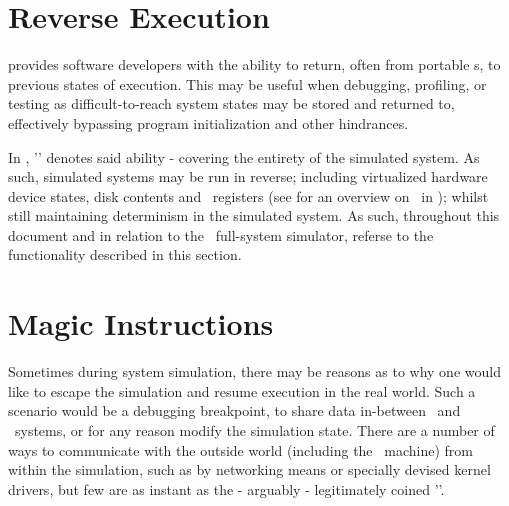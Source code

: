 \section{Reverse Execution}
\label{sec:background_reverseexecution}

 provides software developers with the ability to return, often from portable \dvttermcheckpoint s, to previous states of execution.
This may be useful when debugging, profiling, or testing as difficult-to-reach system states may be stored and returned to, effectively bypassing program initialization and other hindrances.

In \dvttermsimics , '\dvttermreverseexecution ' denotes said ability - covering the entirety of the simulated system.
As such, simulated systems may be run in reverse; including virtualized hardware device states, disk contents and \dvttermcpu\ registers (see  for an overview on \dvttermreverseexecution\ in \dvttermsimics ); whilst still maintaining determinism in the simulated system.
As such, throughout this document and in relation to the \dvttermsimics\ full-system simulator, \dvttermreverseexecution referse to the functionality described in this section.

\section{Magic Instructions}
\label{sec:background_magicinstructions}
Sometimes during system simulation, there may be reasons as to why one would like to escape the simulation and resume execution in the real world.
Such a scenario would be a debugging breakpoint, to share data in-between \dvttermtarget\ and \dvttermhost\ systems, or for any reason modify the simulation state.
There are a number of ways to communicate with the outside world (including the \dvttermhost\ machine) from within the simulation, such as by networking means or specially devised kernel drivers, but few are as instant as the - arguably - legitimately coined '\dvttermmagicinstruction '.

